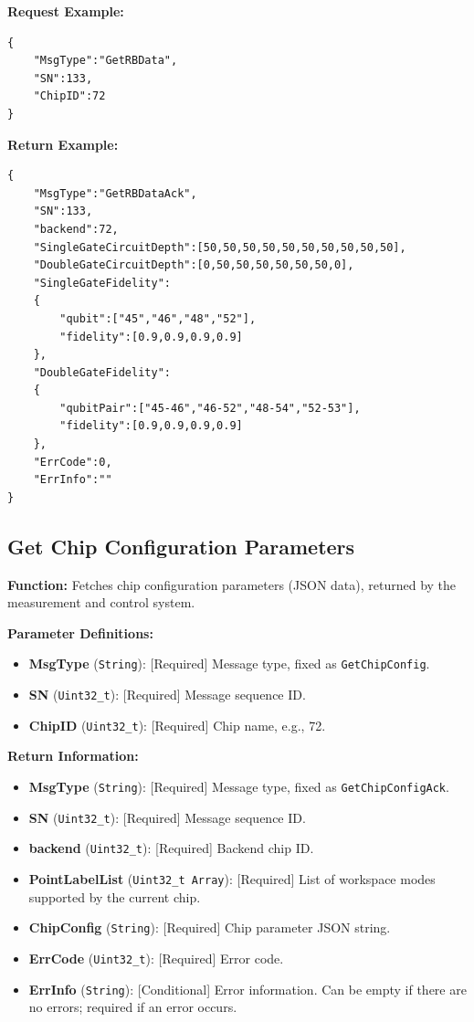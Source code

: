 \documentclass[12pt, a4paper]{article}
\begin{document}
\noindent \textbf{Request Example:}
\begin{lstlisting}
{
    "MsgType":"GetRBData",
    "SN":133,
    "ChipID":72
}
\end{lstlisting}

\noindent \textbf{Return Example:}
\begin{lstlisting}
{
    "MsgType":"GetRBDataAck",
    "SN":133,
    "backend":72,
    "SingleGateCircuitDepth":[50,50,50,50,50,50,50,50,50,50],
    "DoubleGateCircuitDepth":[0,50,50,50,50,50,50,0],
    "SingleGateFidelity":
    {
        "qubit":["45","46","48","52"],
        "fidelity":[0.9,0.9,0.9,0.9]
    },
    "DoubleGateFidelity":
    {
        "qubitPair":["45-46","46-52","48-54","52-53"],
   	    "fidelity":[0.9,0.9,0.9,0.9]
    },
    "ErrCode":0,
    "ErrInfo":"" 
}
\end{lstlisting}

\subsection{Get Chip Configuration Parameters}

\textbf{Function:} Fetches chip configuration parameters (JSON data), returned by the measurement and control system.

\textbf{Parameter Definitions:}
\begin{itemize}
    \item \textbf{MsgType} (\texttt{String}): [Required] Message type, fixed as \texttt{GetChipConfig}.
    \item \textbf{SN} (\texttt{Uint32\_t}): [Required] Message sequence ID.
    \item \textbf{ChipID} (\texttt{Uint32\_t}): [Required] Chip name, e.g., 72.
\end{itemize}

\textbf{Return Information:}
\begin{itemize}
    \item \textbf{MsgType} (\texttt{String}): [Required] Message type, fixed as \texttt{GetChipConfigAck}.
    \item \textbf{SN} (\texttt{Uint32\_t}): [Required] Message sequence ID.
    \item \textbf{backend} (\texttt{Uint32\_t}): [Required] Backend chip ID.
    \item \textbf{PointLabelList} (\texttt{Uint32\_t Array}): [Required] List of workspace modes supported by the current chip.
    \item \textbf{ChipConfig} (\texttt{String}): [Required] Chip parameter JSON string.
    \item \textbf{ErrCode} (\texttt{Uint32\_t}): [Required] Error code.
    \item \textbf{ErrInfo} (\texttt{String}): [Conditional] Error information. Can be empty if there are no errors; required if an error occurs.
\end{itemize}
\end{document}
